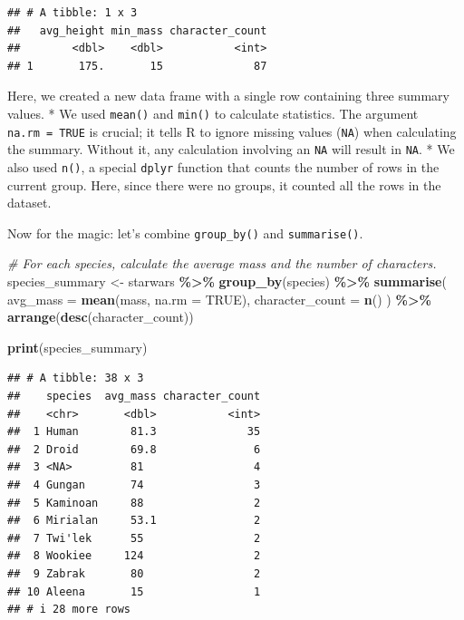 \documentclass[
  11pt,
]{article}
\newenvironment{Shaded}{\begin{snugshade}}{\end{snugshade}}
\newcommand{\AttributeTok}[1]{\textcolor[rgb]{0.13,0.29,0.53}{#1}}
\newcommand{\CommentTok}[1]{\textcolor[rgb]{0.56,0.35,0.01}{\textit{#1}}}
\newcommand{\ConstantTok}[1]{\textcolor[rgb]{0.56,0.35,0.01}{#1}}
\newcommand{\FunctionTok}[1]{\textcolor[rgb]{0.13,0.29,0.53}{\textbf{#1}}}
\newcommand{\NormalTok}[1]{#1}
\newcommand{\OtherTok}[1]{\textcolor[rgb]{0.56,0.35,0.01}{#1}}
\newcommand{\SpecialCharTok}[1]{\textcolor[rgb]{0.81,0.36,0.00}{\textbf{#1}}}
\begin{document}
\begin{verbatim}
## # A tibble: 1 x 3
##   avg_height min_mass character_count
##        <dbl>    <dbl>           <int>
## 1       175.       15              87
\end{verbatim}

Here, we created a new data frame with a single row containing three
summary values. * We used \texttt{mean()} and \texttt{min()} to
calculate statistics. The argument \texttt{na.rm\ =\ TRUE} is crucial;
it tells R to ignore missing values (\texttt{NA}) when calculating the
summary. Without it, any calculation involving an \texttt{NA} will
result in \texttt{NA}. * We also used \texttt{n()}, a special
\texttt{dplyr} function that counts the number of rows in the current
group. Here, since there were no groups, it counted all the rows in the
dataset.

Now for the magic: let's combine \texttt{group\_by()} and
\texttt{summarise()}.

\begin{Shaded}
\begin{Highlighting}[]
\CommentTok{\# For each species, calculate the average mass and the number of characters.}
\NormalTok{species\_summary }\OtherTok{\textless{}{-}}\NormalTok{ starwars }\SpecialCharTok{\%\textgreater{}\%}
  \FunctionTok{group\_by}\NormalTok{(species) }\SpecialCharTok{\%\textgreater{}\%}
  \FunctionTok{summarise}\NormalTok{(}
    \AttributeTok{avg\_mass =} \FunctionTok{mean}\NormalTok{(mass, }\AttributeTok{na.rm =} \ConstantTok{TRUE}\NormalTok{),}
    \AttributeTok{character\_count =} \FunctionTok{n}\NormalTok{()}
\NormalTok{  ) }\SpecialCharTok{\%\textgreater{}\%}
  \FunctionTok{arrange}\NormalTok{(}\FunctionTok{desc}\NormalTok{(character\_count))}

\FunctionTok{print}\NormalTok{(species\_summary)}
\end{Highlighting}
\end{Shaded}

\begin{verbatim}
## # A tibble: 38 x 3
##    species  avg_mass character_count
##    <chr>       <dbl>           <int>
##  1 Human        81.3              35
##  2 Droid        69.8               6
##  3 <NA>         81                 4
##  4 Gungan       74                 3
##  5 Kaminoan     88                 2
##  6 Mirialan     53.1               2
##  7 Twi'lek      55                 2
##  8 Wookiee     124                 2
##  9 Zabrak       80                 2
## 10 Aleena       15                 1
## # i 28 more rows
\end{verbatim}
\end{document}

